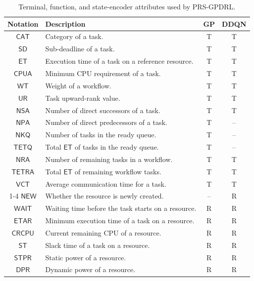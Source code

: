 \documentclass[10pt,journal]{IEEEtran}
\begin{document}
\begin{table}[!t]
\centering
\caption{Terminal, function, and state-encoder attributes used by PRS-GPDRL.}
\label{Table:scheduling-attributes}
\setlength{\tabcolsep}{.8pt}
\begin{tabular}{@{}cp{}cc@{}}
\toprule
Notation & Description & GP & DDQN \\
\midrule
$\mathsf{CAT}$   & Category of a task. & T & T \\
$\mathsf{SD}$    & Sub-deadline of a task. & T & T \\
$\mathsf{ET}$    & Execution time of a task on a reference resource. & T & T \\
$\mathsf{CPUA}$  & Minimum CPU requirement of a task. & T & T \\
$\mathsf{WT}$    & Weight of a workflow. & T & T \\
$\mathsf{UR}$    & Task upward-rank value. & T & T \\
$\mathsf{NSA}$   & Number of direct successors of a task. & T & T \\
$\mathsf{NPA}$   & Number of direct predecessors of a task. & T & -- \\
$\mathsf{NKQ}$   & Number of tasks in the ready queue. & T & -- \\
$\mathsf{TETQ}$  & Total $\mathsf{ET}$ of tasks in the ready queue. & T & -- \\
$\mathsf{NRA}$   & Number of remaining tasks in a workflow. & T & T \\
$\mathsf{TETRA}$ & Total $\mathsf{ET}$ of remaining workflow tasks. & T & T \\
$\mathsf{VCT}$   & Average communication time for a task. & T & T \\
\cmidrule(lr){1-4}
$\mathsf{NEW}$   & Whether the resource is newly created. & -- & R \\
$\mathsf{WAIT}$  & Waiting time before the task starts on a resource. & R & R \\
$\mathsf{ETAR}$  & Minimum execution time of a task on a resource. & R & R \\
$\mathsf{CRCPU}$ & Current remaining CPU of a resource. & R & R \\
$\mathsf{ST}$    & Slack time of a task on a resource. & R & R \\
$\mathsf{STPR}$  & Static power of a resource. & R & R \\
$\mathsf{DPR}$   & Dynamic power of a resource. & R & R \\

\end{tabular}
\end{table}
\end{document}
